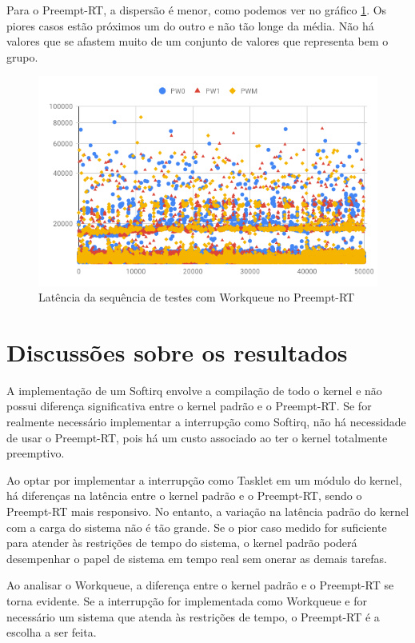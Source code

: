 Para o Preempt-RT, a dispersão é menor, como podemos ver no gráfico \ref{grafico:p-workqueue}. Os piores casos estão próximos um do outro e não tão longe da média. Não há valores que se afastem muito de um conjunto de valores que representa bem o grupo.

\begin{figure}[!htb]
    \centering
    \includegraphics[width=\textwidth]{graficos/pw-scatter.png}
    \caption{Latência da sequência de testes com Workqueue no Preempt-RT}
    \label{grafico:p-workqueue}
\end{figure}

\section{Discussões sobre os resultados}

A implementação de um Softirq envolve a compilação de todo o kernel e não possui diferença significativa entre o kernel padrão e o Preempt-RT. Se for realmente necessário implementar a interrupção como Softirq, não há necessidade de usar o Preempt-RT, pois há um custo associado ao ter o kernel totalmente preemptivo.

Ao optar por implementar a interrupção como Tasklet em um módulo do kernel, há diferenças na latência entre o kernel padrão e o Preempt-RT, sendo o Preempt-RT mais responsivo. No entanto, a variação na latência padrão do kernel com a carga do sistema não é tão grande. Se o pior caso medido for suficiente para atender às restrições de tempo do sistema, o kernel padrão poderá desempenhar o papel de sistema em tempo real sem onerar as demais tarefas.

Ao analisar o Workqueue, a diferença entre o kernel padrão e o Preempt-RT se torna evidente. Se a interrupção for implementada como Workqueue e for necessário um sistema que atenda às restrições de tempo, o Preempt-RT é a escolha a ser feita.

